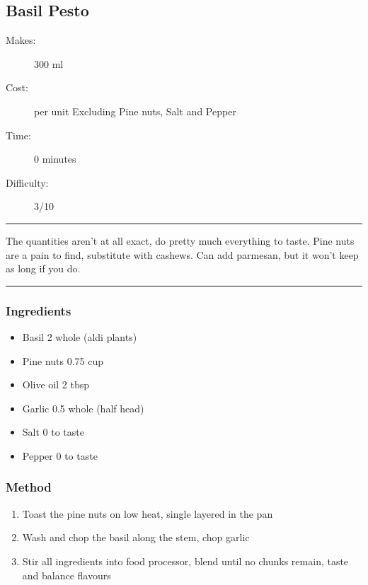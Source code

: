 \documentclass[]{article}
\begin{document}
\subsection*{\center\huge Basil Pesto}
\begin{description}
\item[Makes:] 300 ml
\item[Cost:]  per unit Excluding Pine nuts, Salt and Pepper
\item[Time:] 0 minutes
\item[Difficulty:] 3/10
\end{description}
\vspace{0.2cm}\hrule\vspace{0.5cm}
\begin{adjustwidth}{0.5 cm}{0.5 cm}

The quantities aren’t at all exact, do pretty much everything to taste. Pine nuts are a pain to find, substitute with cashews. Can add parmesan, but it won't keep as long if you do. \hfill\color{accent}{\Large\faVimeoSquare\hspace{0.1cm}\faGlide\hspace{0.1cm}\faTruck\hspace{0.1cm}\faHeart\hspace{0.1cm}}\color{black}

\end{adjustwidth}
\vspace{0.5cm}\hrule
\subsubsection*{\Large Ingredients}
\begin{multicols}{2}
\begin{itemize}
 \item Basil \hfill 2 whole (aldi plants)
 \item Pine nuts \hfill 0.75 cup
 \item Olive oil \hfill 2 tbsp
 \item Garlic \hfill 0.5 whole (half head)
 \item Salt \hfill 0 to taste
 \item Pepper \hfill 0 to taste
\end{itemize}
\end{multicols}
\subsubsection*{\Large Method}
\begin{enumerate}[font=\huge\color{accent}]
	\item Toast the pine nuts on low heat, single layered in the pan
	\item Wash and chop the basil along the stem, chop garlic
	\item Stir all ingredients into food processor, blend until no chunks remain, taste and balance flavours
\end{enumerate}
\newpage
{}\label{rec:Bechamel}
\end{document}

